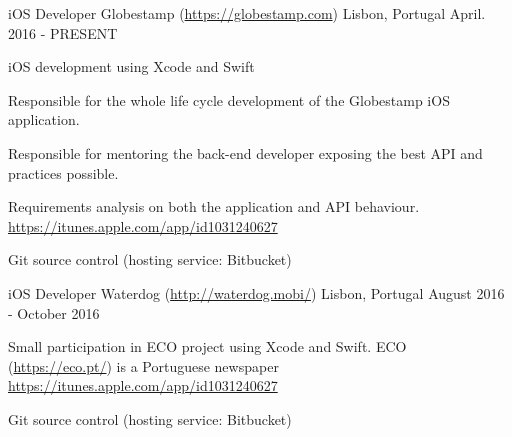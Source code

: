 

\begin{cventries}

  \cventry
    {iOS Developer} %
    {Globestamp (\url{https://globestamp.com}) } %
    {Lisbon, Portugal} %
    {April. 2016 - PRESENT} %
    {
      \begin{cvitems} %
      	\item{iOS development using Xcode and Swift}
        \item {Responsible for the whole life cycle development of the Globestamp iOS application.}
        \item {Responsible for mentoring the back-end developer exposing the best API and practices possible.}
        \item {Requirements analysis on both the application and API behaviour.\\}
		\url{https://itunes.apple.com/app/id1031240627}
	 	\item {Git source control (hosting service: Bitbucket)}
      \end{cvitems}
    }

  \cventry
	{iOS Developer} %
    {Waterdog (\url{http://waterdog.mobi/}) } %
    {Lisbon, Portugal} %
    {August 2016 - October 2016} %
    {
	\begin{cvitems} %
		\item {Small participation in ECO project using Xcode and Swift. ECO (\url{https://eco.pt/}) is a Portuguese newspaper\\}
		\url{https://itunes.apple.com/app/id1031240627}
		\item {Git source control (hosting service: Bitbucket)}
	\end{cvitems}
}


\end{cventries}

